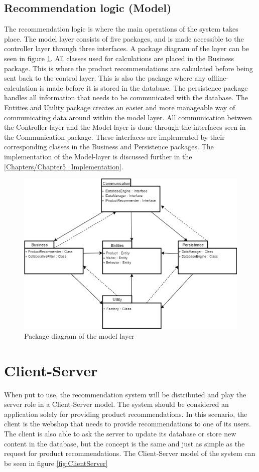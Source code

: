 \subsection{Recommendation logic (Model)}
The recommendation logic is where the main operations of the system takes place. The model layer consists of five packages, and is made accessible to the controller layer through three interfaces. A package diagram of the layer can be seen in figure \ref{fig:PackageDiagram}. All classes used for calculations are placed in the Business package. This is where the product recommendations are calculated before being sent back to the control layer. This is also the package where any offline-calculation is made before it is stored in the database. The persistence package handles all information that needs to be communicated with the database. The Entities and Utility package creates an easier and more manageable way of communicating data around within the model layer. All communication between the Controller-layer and the Model-layer is done through the interfaces seen in the Communication package. These interfaces are implemented by their corresponding classes in the Business and Persistence packages. The implementation of the Model-layer is discussed further in the \ref{Chapters/Chapter5_Implementation}.

\begin{figure}
	\centering
	\includegraphics[width=.8\linewidth]{Figures/PackageDiagram.png}
	\caption{Package diagram of the model layer}
	\label{fig:PackageDiagram}
\end{figure}

\section{Client-Server}
When put to use, the recommendation system will be distributed and play the server role in a Client-Server model. The system should be considered an application solely for providing product recommendations. In this scenario, the client is the webshop that needs to provide recommendations to one of its users. The client is also able to ask the server to update its database or store new content in the database, but the concept is the same and just as simple as the request for product recommendations. The Client-Server model of the system can be seen in figure \ref{fig:ClientServer}

